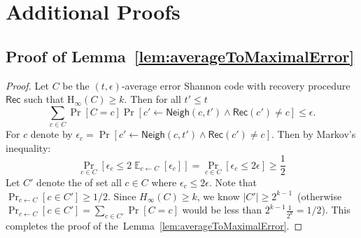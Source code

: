 \documentclass[11pt]{article}
\newcommand{\lemref}[1]{\mbox{Lemma~\ref{#1}}}
\DeclareMathOperator*{\expe}{\mathbb{E}}
\newcommand{\class}[1]{{\ensuremath{\mathsf{#1}}}}
\newcommand{\rec}{\ensuremath{\class{Rec}}\xspace}
\newcommand{\sample}{\ensuremath{\class{Sample}}\xspace}
\newcommand{\neigh}{\ensuremath{\class{Neigh}}\xspace}
\newcommand{\Hoo}{\mathrm{H}_\infty}
\begin{document}
\section{Additional Proofs}

\subsection{Proof of \lemref{lem:averageToMaximalError}}
\label{sec:proof of average to maximal error}
\begin{proof}
Let $C$ be the  $(t,\epsilon)$-average error Shannon code with recovery procedure $\rec$ such that  $\Hoo(C)\geq k$.  Then for all $t'\le t$
\[
\sum_{c\in C} \Pr[C=c]\Pr[ c'\leftarrow \neigh (c, t') \wedge \rec(c') \neq c]\leq \epsilon.
\]
For $c$ denote by $\epsilon_c = \Pr[c'\leftarrow \neigh(c, t') \wedge \rec(c') \neq c]$.  
Then by Markov's inequality:
\[
\Pr_{c\in C}[ \epsilon_c \leq 2\expe_{c\leftarrow C} [\epsilon_c ] ] = \Pr_{c\in C} [\epsilon_c \le 2\epsilon ] \geq \frac{1}{2}
\]
Let $C'$ denote the of  set all $c\in C$ where $\epsilon_c\leq 2\epsilon$.  Note that $\Pr_{c\leftarrow C}[c\in C']\geq 1/2$.  Since $H_\infty(C)\geq k$, we know $|C'|\geq 2^{k-1}$~(otherwise $\Pr_{c\leftarrow C}[c\in C']=\sum_{c\in C'}\Pr[C=c]$ would be less than $2^{k-1}\frac{1}{2^k} = 1/2$).  This completes the proof of the~\lemref{lem:averageToMaximalError}.

\end{proof}
\end{document}
